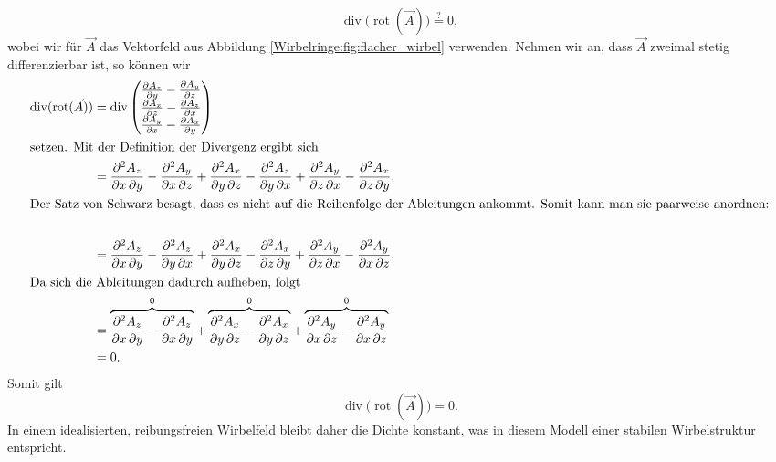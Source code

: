 \begin{equation*}
\operatorname{div} \big( \operatorname{rot} ( \vec{A} ) \big)
\stackrel{?}{=}
0,
\end{equation*}
wobei wir für \(\vec{A}\) das Vektorfeld aus Abbildung \ref{Wirbelringe:fig:flacher_wirbel} verwenden.
Nehmen wir an, dass \(\vec{A}\) zweimal stetig differenzierbar ist, so können wir
\begin{align*}
\operatorname{div} ( \operatorname{rot} ( \vec{A} ) )
&=
\operatorname{div}      
    \begin{pmatrix} 
        \frac{\partial A_z}{\partial y} - \frac{\partial A_y}{\partial z} \\ 
        \frac{\partial A_x}{\partial z} - \frac{\partial A_z}{\partial x} \\ 
        \frac{\partial A_y}{\partial x} - \frac{\partial A_x}{\partial y} \\ 
    \end{pmatrix} \\
\intertext{setzen. Mit der Definition der Divergenz ergibt sich}
&=
\frac{\partial^2 A_z}{\partial x\, \partial y} - \frac{\partial^2 A_y}{\partial x\, \partial z} + 
\frac{\partial^2 A_x}{\partial y\, \partial z} - \frac{\partial^2 A_z}{\partial y\, \partial x} +
\frac{\partial^2 A_y}{\partial z\, \partial x} - \frac{\partial^2 A_x}{\partial z\, \partial y}
.\\
\intertext{Der Satz von Schwarz besagt, dass es nicht auf die Reihenfolge der Ableitungen ankommt. Somit kann man sie paarweise anordnen:}\\
&=
\frac{\partial^2 A_z}{\partial x\, \partial y} - \frac{\partial^2 A_z}{\partial y\, \partial x} + 
\frac{\partial^2 A_x}{\partial y\, \partial z} - \frac{\partial^2 A_x}{\partial z\, \partial y} +
\frac{\partial^2 A_y}{\partial z\, \partial x} - \frac{\partial^2 A_y}{\partial x\, \partial z}.
\\
\intertext{Da sich die Ableitungen dadurch aufheben, folgt}
&=
\overbrace{\frac{\partial^2 A_z}{\partial x\, \partial y} - \frac{\partial^2 A_z}{\partial x\, \partial y}}^0 + 
\overbrace{\frac{\partial^2 A_x}{\partial y\, \partial z} - \frac{\partial^2 A_x}{\partial y\, \partial z}}^0 +
\overbrace{\frac{\partial^2 A_y}{\partial x\, \partial z} - \frac{\partial^2 A_y}{\partial x\, \partial z}}^0
\\
&=
0.
\end{align*}
Somit gilt 
\begin{equation} 
    \label{Wirbelringe:eq:wIdent} 
    \operatorname{div} \big( \operatorname{rot} ( \vec{A} ) \big) 
    = 
    0. 
\end{equation} 
In einem idealisierten, reibungsfreien Wirbelfeld bleibt daher die Dichte konstant, was in diesem Modell einer stabilen Wirbelstruktur entspricht.

